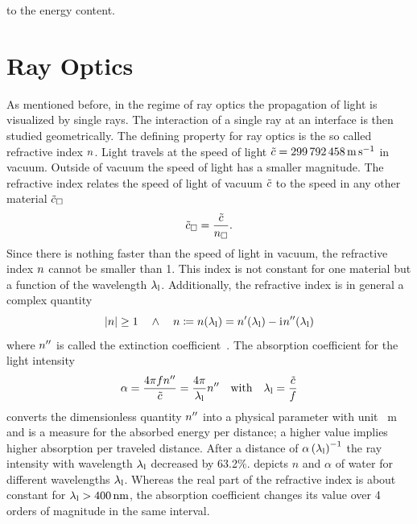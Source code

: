 to the energy content.
\section{Ray Optics\label{sec:TO-rayoptics}}

As mentioned before, in the regime of ray optics the propagation of light is 
visualized by single rays. The interaction of a single ray at an interface is 
then studied geometrically. The defining property for ray optics is the so 
called refractive index $n$. Light travels at the speed of light 
$\tilde{\speed}=\SI{299792458}{\m\per\s}$ in vacuum. Outside of vacuum the 
speed of light has a smaller magnitude. The refractive index relates the speed 
of light of vacuum $\tilde{c}$ to the speed in any other material 
$\tilde{c}_{\Box}$
\begin{equation}
  \tilde{c}_{\Box} = \frac{\tilde{c}}{n_{\Box}}.
  \label{eq:TO-lightspeed}
\end{equation}
Since there is nothing faster than the speed of light in vacuum, the refractive 
index $n$ cannot be smaller than 1. This index is not constant for 
one material but a function of the wavelength $\lambda_{\mathrm{l}}$. Additionally, the 
refractive index is in general a complex quantity
\begin{equation}
  \abs{n}\geq 1 \quad \wedge \quad n \coloneqq 
  n(\lambda_{\mathrm{l}}) = n^{\prime}(\lambda_{\mathrm{l}}) - \mathrm{i}\mkern1mu n^{\prime\prime}(\lambda_{\mathrm{l}})
  \label{eq:TO-refractive-index}
\end{equation}
where $n^{\prime\prime}$ is called the extinction coefficient~\cite{Jackson2013}. The 
absorption coefficient for the light intensity~\cite{Hecht2017}
\begin{equation}
  \alpha = \frac{4\pi f n^{\prime\prime}}{\tilde{c}} = 
  \frac{4\pi}{\lambda_{\mathrm{l}}}n^{\prime\prime}\quad\text{with}\quad\lambda_{\mathrm{l}}=\frac{\tilde{c}}{f}
  \label{eq:TO-alpha}
\end{equation}
converts the dimensionless quantity $n^{\prime\prime}$ into a physical parameter with 
unit \si{\per\meter} and is a measure for the absorbed energy per distance; a 
higher value implies higher absorption per traveled distance. After a distance 
of $\alpha\left(\lambda_{\mathrm{l}}\right)^{-1}$ the ray intensity with wavelength $\lambda_{\mathrm{l}}$ 
decreased by 63.2\%.  depicts $n$ and $\alpha$ of water 
for different wavelengths $\lambda_{\mathrm{l}}$. Whereas the real part of the refractive index 
is about constant for $\lal > \SI{400}{\nm}$, the absorption coefficient 
changes its value over 4 orders of magnitude in the same interval.

